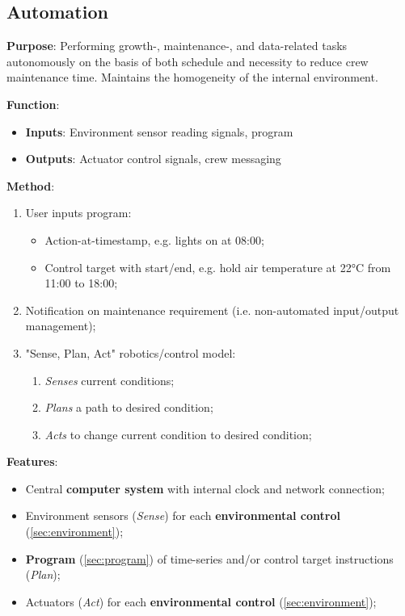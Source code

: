 \documentclass{report}
\begin{document}
\newpage

\subsection{Automation}
\label{sec:automation}

\textbf{Purpose}: Performing growth-, maintenance-, and data-related tasks autonomously on the basis of both schedule and necessity to reduce crew maintenance time. Maintains the homogeneity of the internal environment.

\textbf{Function}:
\begin{itemize}
    \item \textbf{Inputs}: Environment sensor reading signals, program
    \item \textbf{Outputs}: Actuator control signals, crew messaging
\end{itemize}

\textbf{Method}:
\begin{enumerate}
    \item User inputs program:
    \begin{itemize}
        \item Action-at-timestamp, e.g. lights on at 08:00;
        \item Control target with start/end, e.g. hold air temperature at 22°C from 11:00 to 18:00;
    \end{itemize}
    \item Notification on maintenance requirement (i.e. non-automated input/output management);
    \item "Sense, Plan, Act" robotics/control model:
    \begin{enumerate}
        \item \textit{Senses} current conditions;
        \item \textit{Plans} a path to desired condition;
        \item \textit{Acts} to change current condition to desired condition;
    \end{enumerate}
\end{enumerate}

\textbf{Features}:
\begin{itemize}
    \item Central \textbf{computer system} with internal clock and network connection;
    \item Environment sensors (\textit{Sense}) for each \textbf{environmental control} (\ref{sec:environment});
    \item \textbf{Program} (\ref{sec:program}) of time-series and/or control target instructions (\textit{Plan});
    \item Actuators (\textit{Act}) for each \textbf{environmental control} (\ref{sec:environment});
\end{itemize}
\end{document}
